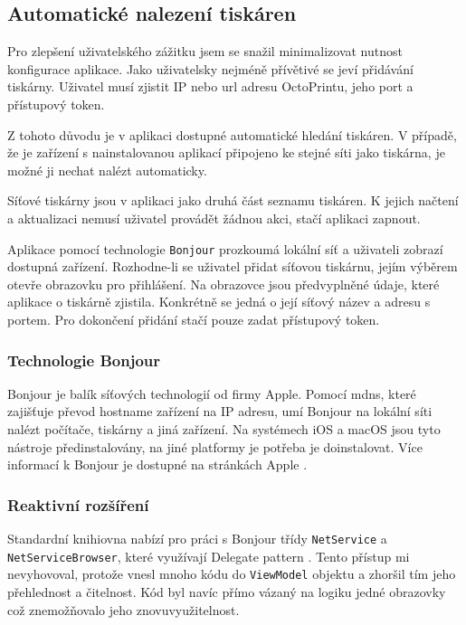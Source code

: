 \subsection{Automatické nalezení tiskáren}

Pro zlepšení uživatelského zážitku jsem se snažil minimalizovat nutnost konfigurace aplikace.
Jako uživatelsky nejméně přívětivé se jeví přidávání tiskárny.
Uživatel musí zjistit IP nebo \acrshort{url} adresu OctoPrintu, jeho port a přístupový token.

Z tohoto důvodu je v aplikaci dostupné automatické hledání tiskáren.
V případě, že je zařízení s nainstalovanou aplikací připojeno ke stejné síti jako tiskárna, je možné ji nechat nalézt automaticky.

Síťové tiskárny jsou v aplikaci jako druhá část seznamu tiskáren.
K jejich načtení a aktualizaci nemusí uživatel provádět žádnou akci, stačí aplikaci zapnout.

Aplikace pomocí technologie \texttt{Bonjour} prozkoumá lokální síť a uživateli zobrazí dostupná zařízení.
Rozhodne-li se uživatel přidat síťovou tiskárnu, jejím výběrem otevře obrazovku pro přihlášení.
Na obrazovce jsou předvyplněné údaje, které aplikace o tiskárně zjistila.
Konkrétně se jedná o její síťový název a adresu s portem.
Pro dokončení přidání stačí pouze zadat přístupový token.

\subsubsection*{Technologie Bonjour}

Bonjour je balík síťových technologií od firmy Apple.
Pomocí \acrfull{mdns}, které zajišťuje převod hostname zařízení na IP adresu, umí Bonjour na lokální síti nalézt počítače, tiskárny a jiná zařízení.
Na systémech iOS a macOS jsou tyto nástroje předinstalovány, na jiné platformy je potřeba je doinstalovat.
Více informací k Bonjour je dostupné na stránkách Apple \cite{apple-bonjour}.

\subsubsection*{Reaktivní rozšíření}

Standardní knihiovna nabízí pro práci s Bonjour třídy \texttt{NetService} a \texttt{NetServiceBrowser}, které využívají Delegate pattern \cite{apple-netservicebrowser}.
Tento přístup mi nevyhovoval, protože vnesl mnoho kódu do \texttt{ViewModel} objektu a zhoršil tím jeho přehlednost a čitelnost.
Kód byl navíc přímo vázaný na logiku jedné obrazovky což znemožňovalo jeho znovuvyužitelnost.

